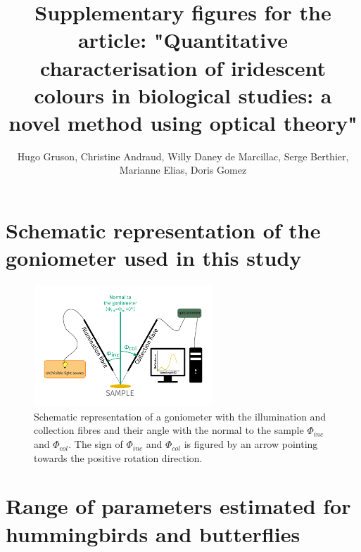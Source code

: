 \documentclass[a4]{article}
\title{Supplementary figures for the article: "Quantitative characterisation of iridescent colours in biological studies: a novel method using optical theory"}
\author{Hugo Gruson, Christine Andraud, Willy Daney de Marcillac, Serge Berthier,\\ Marianne Elias, Doris Gomez}
\date{}
\begin{document}
    \maketitle
    
    \section*{Schematic representation of the goniometer used in this study}
    
    \begin{figure}[!h]
        \centering
        \includegraphics[width=0.6\textwidth]{gonio.pdf}
        \caption{Schematic representation of a goniometer with the illumination and collection fibres and their angle with the normal to the sample $\Phi_{inc}$ and $\Phi_{col}$. The sign of $\Phi_{inc}$ and $\Phi_{col}$ is figured by an arrow pointing towards the positive rotation direction.}
    \end{figure}
    
    \clearpage
    
    \section*{Range of parameters estimated for hummingbirds and butterflies}
    
\end{document}
